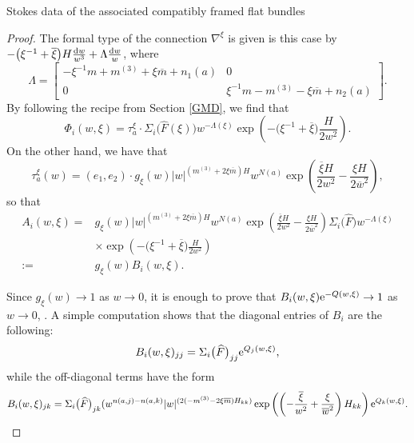 \begin{subsubsection}{Stokes data of the associated compatibly framed flat bundles}
\begin{proof}
The formal type of the connection $\nabla^{\xi}$ is given is this case by
$
 -\bigl(\xi^{-1}+\overline{\xi}\bigr)H\frac{{\rm d}w}{w^3}+\Lambda\frac{{\rm d}w}{w}$,
where
\begin{equation*}
 \Lambda=\begin{bmatrix}-\xi^{-1}m +m^{(3)}+\xi \overline{m} +n_1(a) & 0\\
 0& \xi^{-1}m -m^{(3)}-\xi \overline{m} +n_2(a)
 \end{bmatrix}.
\end{equation*}
By following the recipe from Section \ref{GMD}, we find that
\begin{equation*}
 \Phi_i(w,\xi)=\tau_{a}^{\xi}\cdot\Sigma_i\bigl(\widehat{F}(\xi)\bigr) w^{-\Lambda(\xi)}\exp \left(-\bigl(\xi^{-1}+\overline{\xi}\bigr)\frac{H}{2w^2}\right).
\end{equation*}
On the other hand, we have that
\begin{equation*}
 \tau_{a}^{\xi}(w)=(e_1,e_2)\cdot g_{\xi}(w) |w|^{(m^{(3)}+2\xi \overline{m})H}w^{N(a)}\exp \left(\frac{\overline{\xi}H}{2w^2}-\frac{\xi H}{2\overline{w}^2}\right),
\end{equation*}
so that
\begin{align*}
 A_i(w,\xi)={}& g_{\xi}(w) |w|^{(m^{(3)}+2\xi \overline{m})H}w^{N(a)}\exp \left(\frac{\overline{\xi}H}{2w^2}-\frac{\xi H}{2\overline{w}^2}\right)\Sigma_i\bigl(\widehat{F}\bigr) w^{-\Lambda(\xi)}\\
 &\times\exp \left(-\bigl(\xi^{-1}+\overline{\xi}\bigr)\frac{H}{2w^2}\right)\\
:={}&g_{\xi}(w)B_i(w,\xi).
\end{align*}

Since $g_{\xi}(w)\to 1$ as $w \to 0$, it is enough to prove that $B_i(w,\xi){\rm e}^{-Q(w,\xi)}\to 1$ as $w\to 0$, . A simple computation shows that the diagonal entries of $B_i$ are the following:
\begin{equation*}
 B_{i}(w,\xi)_{jj}=\Sigma_{i}\bigl(\widehat{F}\bigr)_{jj}{\rm e}^{Q_j(w,\xi)},
\end{equation*}
while the off-diagonal terms have the form
\begin{equation*}
 B_{i}(w,\xi)_{jk}=\Sigma_{i}\bigl(\widehat{F}\bigr)_{jk}(w^{n(a,j)-n(a,k)}|w|^{(2(-m^{(3)}-2\xi \overline{m})H_{kk})}\exp \left(\left(-\frac{\overline{\xi}}{w^2}+\frac{\xi}{\overline{w}^2}\right)H_{kk}\right){\rm e}^{Q_k(w,\xi)}.
\end{equation*}


\end{proof}
\end{subsubsection}

